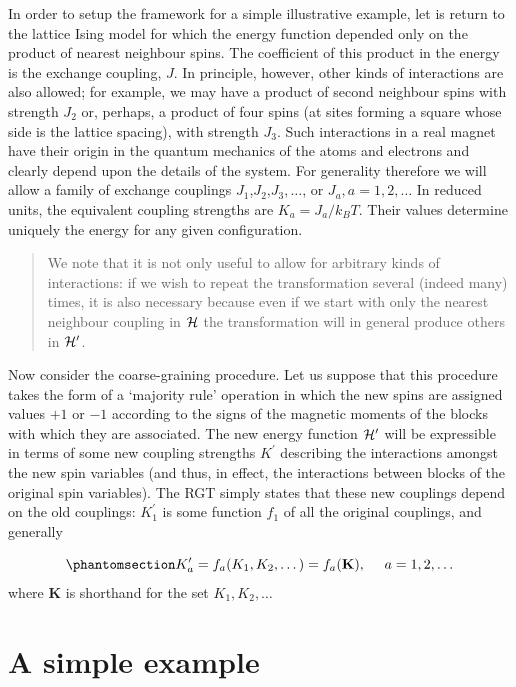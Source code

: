 \documentclass[
  letterpaper,
  enabledeprecatedfontcommands]{report}
\begin{document}
In order to setup the framework for a simple illustrative example, let
is return to the lattice Ising model for which the energy function
depended only on the product of nearest neighbour spins. The coefficient
of this product in the energy is the exchange coupling, \(J\). In
principle, however, other kinds of interactions are also allowed; for
example, we may have a product of second neighbour spins with strength
\(J_2\) or, perhaps, a product of four spins (at sites forming a square
whose side is the lattice spacing), with strength \(J_3\). Such
interactions in a real magnet have their origin in the quantum mechanics
of the atoms and electrons and clearly depend upon the details of the
system. For generality therefore we will allow a family of exchange
couplings \(J_1\),\(J_2\),\(J_3,\dots\), or \(J_a, a =
1,2,\dots\) In reduced units, the equivalent coupling strengths are
\(K_a =J_a/k_BT\). Their values determine uniquely the energy for any
given configuration.

\begin{quote}
We note that it is not only useful to allow for arbitrary kinds of
interactions: if we wish to repeat the transformation several (indeed
many) times, it is also necessary because even if we start with only the
nearest neighbour coupling in \({\cal H}\) the transformation will in
general produce others in \({\cal H}^\prime\).
\end{quote}

Now consider the coarse-graining procedure. Let us suppose that this
procedure takes the form of a `majority rule' operation in which the new
spins are assigned values \(+1\) or \(-1\) according to the signs of the
magnetic moments of the blocks with which they are associated. The new
energy function \({\cal H}^\prime\) will be expressible in terms of some
new coupling strengths \(K^\prime\) describing the interactions amongst
the new spin variables (and thus, in effect, the interactions between
blocks of the original spin variables). The RGT simply states that these
new couplings depend on the old couplings: \(K_1^\prime\) is some
function \(f_1\) of all the original couplings, and generally

\begin{equation}\phantomsection\label{eq-rgt}{K^\prime_a=f_a(K_1,K_2,\dots) =f_a({\bf K}),~~~~ a= 1, 2,\dots
}\end{equation} where \textbf{K} is shorthand for the set
\(K_1, K_2,\dots\)

\section{A simple example}\label{a-simple-example-1}
\end{document}
